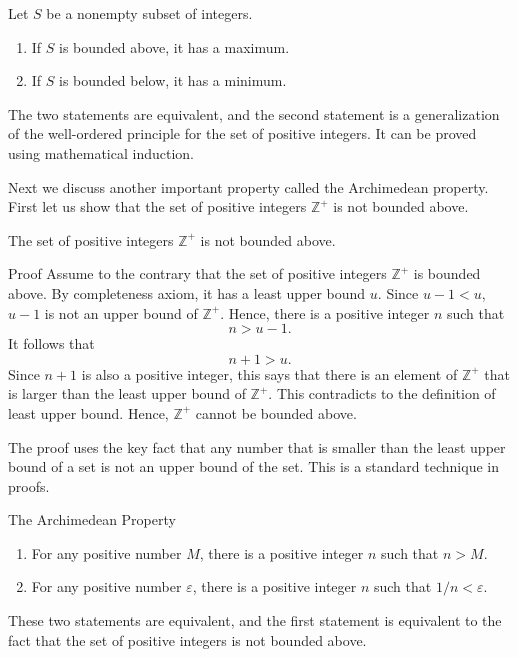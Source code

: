 \begin{proposition}{}
Let $S$ be a nonempty subset of integers.
\begin{enumerate}[1.]
\item If $S$ is bounded above, it has a maximum.
\item If $S$ is bounded below, it has a minimum.
\end{enumerate}
\end{proposition}

The two statements are equivalent, and the second statement is a generalization of the well-ordered principle for the set of positive integers. It can be proved using mathematical induction.


Next we discuss another important property called the Archimedean property. First let us show that the set of positive integers $\mathbb{Z}^+$ is not bounded above. 

\begin{theorem}
[label=thm23020202]{}The set of positive integers $\mathbb{Z}^+$ is not bounded above. 
\end{theorem}
\begin{myproof}{Proof}
Assume to the contrary that the set of positive integers $\mathbb{Z}^+$ is bounded above. By completeness axiom, it has a least upper bound $u$. 
Since $u-1<u$, $u-1$ is not an upper bound of $\mathbb{Z}^+$. Hence, there is a positive integer $n$ such that
\[n>u-1.\]
It follows that
\[n+1>u.\]
 Since $n+1$ is also a positive integer, this says that there is an element of $\mathbb{Z}^+$ that is larger than the least upper bound of $\mathbb{Z}^+$. This contradicts to the definition of least upper bound. Hence, $\mathbb{Z}^+$ cannot be bounded above.
\end{myproof}
The proof uses the key fact  that any number that is smaller than the least upper bound of a set is not an upper bound of the set. This is a standard technique in proofs.

\begin{theorem}{The Archimedean Property}
\begin{enumerate}[1.]
\item
For any positive number $M$, there is a positive integer $n$ such that $n> M$.
\item For any positive number $\varepsilon$, there is a positive integer $n$ such that $1/n<\varepsilon$.
\end{enumerate}
\end{theorem}
These two statements are equivalent, and the first statement is equivalent to the fact that the set of positive integers is not bounded above.
 
